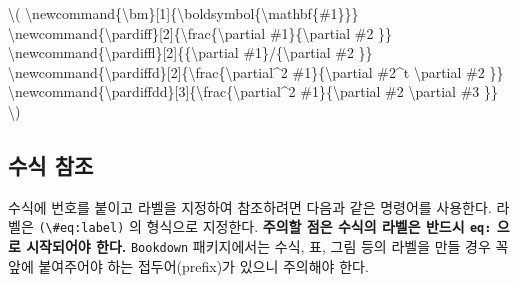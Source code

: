 \documentclass[
]{book}
\newenvironment{Shaded}{\begin{snugshade}}{\end{snugshade}}
\newcommand{\SpecialCharTok}[1]{\textcolor[rgb]{0.00,0.00,0.00}{#1}}
\newcommand{\SpecialStringTok}[1]{\textcolor[rgb]{0.31,0.60,0.02}{#1}}
\theoremstyle{definition}
\theoremstyle{definition}
\theoremstyle{definition}
\theoremstyle{definition}
\theoremstyle{remark}
\begin{document}
\begin{Shaded}
\begin{Highlighting}[]
\SpecialStringTok{\textbackslash{}(}
\SpecialCharTok{\textbackslash{}newcommand}\SpecialStringTok{\{}\SpecialCharTok{\textbackslash{}bm}\SpecialStringTok{\}[1]\{}\SpecialCharTok{\textbackslash{}boldsymbol}\SpecialStringTok{\{}\SpecialCharTok{\textbackslash{}mathbf}\SpecialStringTok{\{\#1\}\}\}}
\SpecialCharTok{\textbackslash{}newcommand}\SpecialStringTok{\{}\SpecialCharTok{\textbackslash{}pardiff}\SpecialStringTok{\}[2]\{}\SpecialCharTok{\textbackslash{}frac}\SpecialStringTok{\{}\SpecialCharTok{\textbackslash{}partial}\SpecialStringTok{ \#1\}\{}\SpecialCharTok{\textbackslash{}partial}\SpecialStringTok{ \#2 \}\}}
\SpecialCharTok{\textbackslash{}newcommand}\SpecialStringTok{\{}\SpecialCharTok{\textbackslash{}pardiffl}\SpecialStringTok{\}[2]\{\{}\SpecialCharTok{\textbackslash{}partial}\SpecialStringTok{ \#1\}/\{}\SpecialCharTok{\textbackslash{}partial}\SpecialStringTok{ \#2 \}\}}
\SpecialCharTok{\textbackslash{}newcommand}\SpecialStringTok{\{}\SpecialCharTok{\textbackslash{}pardiffd}\SpecialStringTok{\}[2]\{}\SpecialCharTok{\textbackslash{}frac}\SpecialStringTok{\{}\SpecialCharTok{\textbackslash{}partial}\SpecialStringTok{\^{}2 \#1\}\{}\SpecialCharTok{\textbackslash{}partial}\SpecialStringTok{ \#2\^{}t }\SpecialCharTok{\textbackslash{}partial}\SpecialStringTok{ \#2 \}\}}
\SpecialCharTok{\textbackslash{}newcommand}\SpecialStringTok{\{}\SpecialCharTok{\textbackslash{}pardiffdd}\SpecialStringTok{\}[3]\{}\SpecialCharTok{\textbackslash{}frac}\SpecialStringTok{\{}\SpecialCharTok{\textbackslash{}partial}\SpecialStringTok{\^{}2 \#1\}\{}\SpecialCharTok{\textbackslash{}partial}\SpecialStringTok{ \#2 }\SpecialCharTok{\textbackslash{}partial}\SpecialStringTok{ \#3 \}\}}
\SpecialStringTok{\textbackslash{})}
\end{Highlighting}
\end{Shaded}

\hypertarget{uxc218uxc2dd-uxcc38uxc870}{%
\subsection{수식 참조}\label{uxc218uxc2dd-uxcc38uxc870}}

수식에 번호를 붙이고 라벨을 지정하여 참조하려면 다음과 같은 명령어를 사용한다. 라벨은 \texttt{(\textbackslash{}\#eq:label)} 의 형식으로 지정한다. \textbf{주의할 점은 수식의 라벨은 반드시 \texttt{eq:} 으로 시작되어야 한다.} \texttt{Bookdown} 패키지에서는 수식, 표, 그림 등의 라벨을 만들 경우 꼭 앞에 붙여주어야 하는 접두어(prefix)가 있으니 주의해야 한다.
\end{document}
